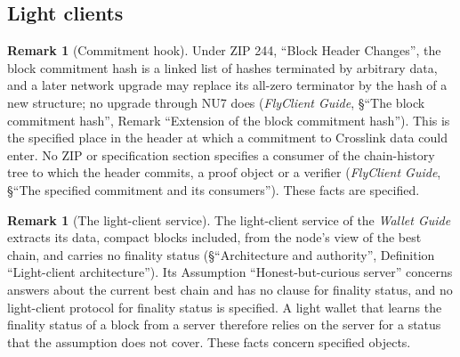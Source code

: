 \documentclass[11pt,a4paper]{article}
\theoremstyle{definition}
\newtheorem{remark}[theorem]{Remark}
\begin{document}
\subsection{Light clients}\label{sec:k-light}

\begin{remark}[Commitment hook]\label{rem:light-hook}
Under ZIP 244, ``Block Header Changes'', the block commitment hash is a
linked list of hashes terminated by arbitrary data, and a later network
upgrade may replace its all-zero terminator by the hash of a new structure;
no upgrade through NU7 does (\emph{FlyClient Guide}, \S``The block commitment
hash'', Remark ``Extension of the block commitment hash''). This is the
specified place in the header at which a commitment to Crosslink data could
enter. No ZIP or specification section specifies a consumer of the
chain-history tree to which the header commits, a proof object or a verifier
(\emph{FlyClient Guide}, \S``The specified commitment and its consumers'').
These facts are specified.
\end{remark}

\begin{remark}[The light-client service]\label{rem:light-server}
The light-client service of the \emph{Wallet Guide} extracts its data,
compact blocks included, from the node's view of the best chain, and carries
no finality status (\S``Architecture and authority'', Definition
``Light-client architecture''). Its Assumption ``Honest-but-curious server''
concerns answers about the current best chain and has no clause for finality
status, and no light-client protocol for finality status is specified. A
light wallet that learns the finality status of a block from a server
therefore relies on the server for a status that the assumption does not
cover. These facts concern specified objects.
\end{remark}
\end{document}
